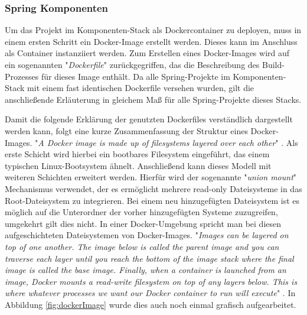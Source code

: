 \subsubsection{Spring Komponenten \checkmark}

Um das Projekt im Komponenten-Stack als Dockercontainer zu deployen, muss in einem ersten Schritt ein Docker-Image erstellt werden. Dieses kann im Anschluss als Container instanziiert werden. Zum Erstellen eines Docker-Images wird auf ein sogenannten "\emph{Dockerfile}" zurückgegriffen, das die Beschreibung des Build-Prozesses für dieses Image enthält. Da alle Spring-Projekte im Komponenten-Stack mit einem fast identischen Dockerfile versehen wurden, gilt die anschließende Erläuterung in gleichem Maß für alle Spring-Projekte dieses Stacks.

Damit die folgende Erklärung der genutzten Dockerfiles verständlich dargestellt werden kann, folgt eine kurze Zusammenfassung der Struktur eines Docker-Images. "\emph{A Docker image is made up of filesystems layered over each other}" \cite[Seite~71]{turnbulldocker}. Als erste Schicht wird hierbei ein bootbares Filesystem eingeführt, das einem typischen Linux-Bootsystem ähnelt. Anschließend kann dieses Modell mit weiteren Schichten erweitert werden. Hierfür wird der sogenannte "\emph{union mount}" Mechanismus verwendet, der es ermöglicht mehrere read-only Dateisysteme in das Root-Dateisystem zu integrieren. Bei einem neu hinzugefügten Dateisystem ist es möglich auf die Unterordner der vorher hinzugefügten Systeme zuzugreifen, umgekehrt gilt dies nicht. In einer Docker-Umgebung spricht man bei diesen aufgeschichteten Dateisystemen von Docker-Images. "\emph{Images can be layered on top of one another.  The image below is called the parent image and you can traverse each layer until you reach the bottom of the image stack where the final image is called the base image.  Finally, when a container is launched from an image, Docker mounts a read-write filesystem on top of any layers below. This is where whatever processes we want our Docker container to run will execute}" \cite[Seite~71]{turnbulldocker}. In Abbildung \ref{fig:dockerImage} wurde dies auch noch einmal grafisch aufgearbeitet.

